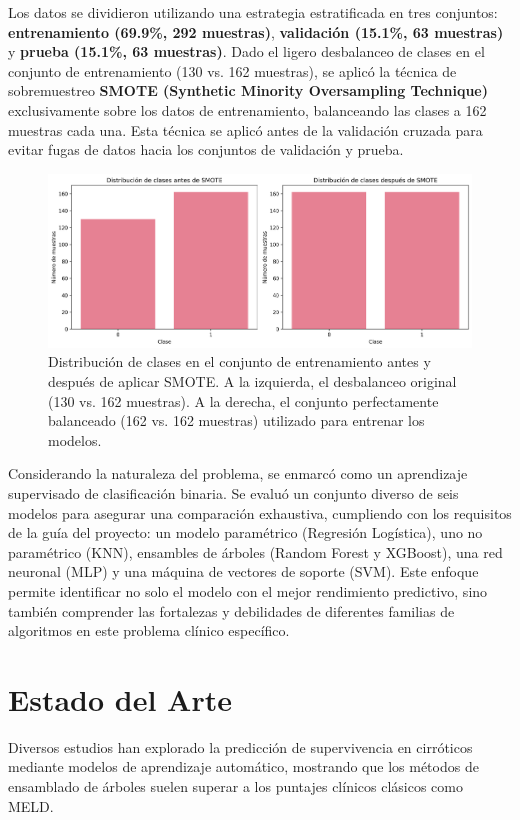 \documentclass[journal]{IEEEtai}
\begin{document}
Los datos se dividieron utilizando una estrategia estratificada en tres conjuntos: \textbf{entrenamiento (69.9\%, 292 muestras)}, \textbf{validación (15.1\%, 63 muestras)} y \textbf{prueba (15.1\%, 63 muestras)}. Dado el ligero desbalanceo de clases en el conjunto de entrenamiento (130 vs. 162 muestras), se aplicó la técnica de sobremuestreo \textbf{SMOTE (Synthetic Minority Oversampling Technique)} exclusivamente sobre los datos de entrenamiento, balanceando las clases a 162 muestras cada una. Esta técnica se aplicó antes de la validación cruzada para evitar fugas de datos hacia los conjuntos de validación y prueba.

\begin{figure}[!t]
\centering
\includegraphics[width=\columnwidth]{graficas/distribucion_clases_smote.png}
\caption{Distribución de clases en el conjunto de entrenamiento antes y después de aplicar SMOTE. A la izquierda, el desbalanceo original (130 vs. 162 muestras). A la derecha, el conjunto perfectamente balanceado (162 vs. 162 muestras) utilizado para entrenar los modelos.}
\label{fig:smote_balance}
\end{figure}

Considerando la naturaleza del problema, se enmarcó como un aprendizaje supervisado de clasificación binaria. Se evaluó un conjunto diverso de seis modelos para asegurar una comparación exhaustiva, cumpliendo con los requisitos de la guía del proyecto: un modelo paramétrico (Regresión Logística), uno no paramétrico (KNN), ensambles de árboles (Random Forest y XGBoost), una red neuronal (MLP) y una máquina de vectores de soporte (SVM). Este enfoque permite identificar no solo el modelo con el mejor rendimiento predictivo, sino también comprender las fortalezas y debilidades de diferentes familias de algoritmos en este problema clínico específico.

\section{Estado del Arte}
Diversos estudios han explorado la predicción de supervivencia en cirróticos mediante modelos de aprendizaje automático, mostrando que los métodos de ensamblado de árboles suelen superar a los puntajes clínicos clásicos como MELD.
\end{document}
